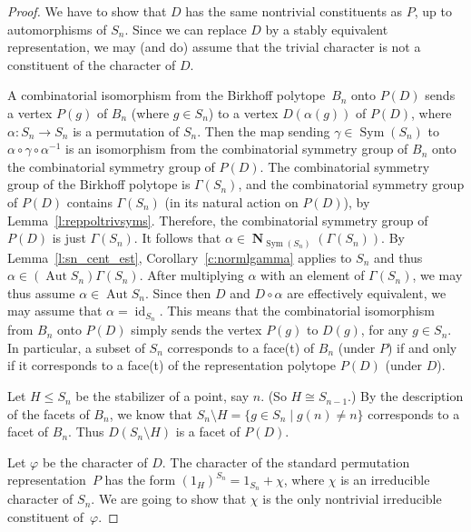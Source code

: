 \documentclass[10pt]{amsart}
\renewcommand{\phi}{\varphi}
\renewcommand{\leq}{\leqslant}
\newcommand{\iso}{\cong}
\newcommand{\Sym}[1]{\operatorname{Sym}(#1)}
\DeclareMathOperator{\Aut}{Aut}
\DeclareMathOperator{\Norml}{\mathbf{N}}
\DeclareMathOperator{\Id}{id}
\begin{document}
\begin{proof}  
  We have to show that $D$ has the same nontrivial constituents
  as $P$, up to automorphisms of $S_n$.
  Since we can replace $D$ by a stably equivalent representation,
  we may (and do) assume that
  the trivial character is not a constituent of the character of $D$.
  
  A combinatorial isomorphism from the Birkhoff polytope~$B_n$
  onto $P(D)$ sends a vertex $P(g)$ of $B_n$ (where $g\in S_n$)
  to a vertex $D(\alpha(g))$ of $P(D)$,
  where $\alpha\colon S_n \to S_n$ is a permutation of $S_n$.
  Then the map sending
  $\gamma\in \Sym{S_n}$ to 
  $\alpha \circ \gamma\circ \alpha^{-1}$
  is an isomorphism from the combinatorial symmetry group of 
  $B_n$ onto the combinatorial symmetry group of $P(D)$.
  The combinatorial symmetry group of the Birkhoff
  polytope is $\Gamma(S_n)$,
  and the combinatorial symmetry group of $P(D)$ contains 
  $\Gamma(S_n)$ (in its natural action on $P(D)$), 
  by Lemma~\ref{l:reppoltrivsyms}.
  Therefore, the combinatorial symmetry group of $P(D)$
  is just $\Gamma(S_n)$.
  It follows that $\alpha \in \Norml_{\Sym{S_n}}(\Gamma(S_n))$.
  By Lemma~\ref{l:sn_cent_est}, Corollary~\ref{c:normlgamma}
  applies to $S_n$ and thus 
  $\alpha\in (\Aut S_n)\Gamma(S_n)$.
  After multiplying $\alpha$ with an element of
  $\Gamma(S_n)$, we may thus assume
  $\alpha \in \Aut S_n$.
  Since then $D$ and $D\circ\alpha$ are effectively equivalent,
  we may assume that $\alpha = \Id_{S_n}$.
  This means that the combinatorial isomorphism from $B_n$ onto $P(D)$
  simply sends the vertex $P(g)$ to $D(g)$, for any $g\in S_n$.
  In particular, a subset of $S_n$ corresponds to a face(t)
  of $B_n$ (under $P$) 
  if and only if it corresponds to a face(t)
  of the representation polytope $P(D)$ (under $D$).
  
  
  
    Let $H \leq S_{n}$ be the stabilizer of a point,
    say $n$. (So $H\iso S_{n-1}$.)
    By the description of the facets of $B_n$, we know that
    $S_n \setminus H = \{g \in S_n\mid g(n)\neq n\}$
    corresponds to a facet of $B_n$.
    Thus $D(S_n\setminus H)$ is a facet of $P(D)$.
      
    Let $\phi$ be the character of $D$.
    The character of the standard permutation representation~$P$
    has the form  $(1_H)^{S_n} = 1_{S_n} + \chi$,
    where $\chi$ is an irreducible character of $S_n$.
    We are going to show that $\chi$ is the only 
    nontrivial irreducible constituent of~$\phi$.
    

\end{proof}
\end{document}
